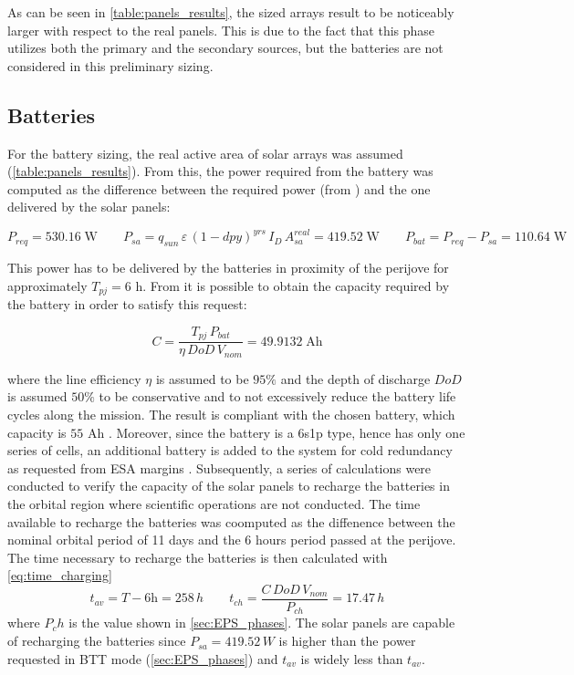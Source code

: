 As can be seen in \autoref{table:panels_results}, the sized arrays result to be noticeably larger with respect to the real panels.
This is due to the fact that this phase utilizes both the primary and the secondary sources, but the batteries are not considered in this preliminary sizing.


\subsection{Batteries}
\label{subsec:battery_sizing}

For the battery sizing, the real active area of solar arrays was assumed (\autoref{table:panels_results}).
From this, the power required from the battery was computed as the difference between the required power (from \mref) and the one delivered by the solar panels:

\begin{equation}
    P_{req} = 530.16 \; \textrm{W} \qquad
    P_{sa} = q_{sun} \, \varepsilon \, \left( 1 - dpy \right) ^ {yrs} \, I_D \, A_{sa}^{real} = 419.52 \; \textrm{W} \qquad
    P_{bat} = P_{req} - P_{sa} = 110.64 \; \textrm{W}
\end{equation}

This power has to be delivered by the batteries in proximity of the perijove for approximately $T_{pj} = 6$ h. From \mref it is possible to obtain the capacity required by the battery in order to satisfy this request:

\begin{equation}
    C = \frac{T_{pj} \, P_{bat}}{\eta \, DoD \, V_{nom}} = 49.9132 \; \textrm{Ah}
\end{equation}

where the line efficiency $\eta$ is assumed to be $95\%$ and the depth of discharge $DoD$ is assumed $50\%$ to be conservative and to not excessively reduce the battery life cycles along the mission. The result is compliant with the chosen battery, which capacity is $55$ Ah \mref.
Moreover, since the battery is a 6s1p type, hence has only one series of cells, an additional battery is added to the system for cold redundancy as requested from ESA margins \mref. Subsequently, a series of calculations were conducted to verify the capacity of the solar panels to recharge the batteries in the orbital region where scientific operations are not conducted. The time available to recharge the batteries was coomputed as the diffenence between the nominal orbital period of 11 days and the 6 hours period passed at the perijove. The time necessary to recharge the batteries is then calculated with \autoref{eq:time_charging}
\begin{equation}
    \label{eq:time_charging}
    t_{av} = T - 6 \textrm{h} = 258 \, h \qquad
    t_{ch}=\frac{C \, DoD \, V_{nom}}{P_{ch}}=17.47 \,h
\end{equation}
where $P_ch$ is the value shown in \autoref{sec:EPS_phases}. The solar panels are capable of recharging the batteries since $P_{sa}=419.52 \, W$ is higher than the power requested in BTT mode (\autoref{sec:EPS_phases}) and $t_{av}$ is widely less than $t_{av}$. 
